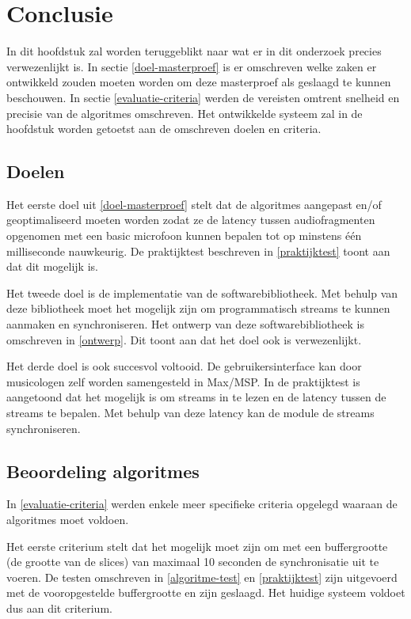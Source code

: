 \chapter{Conclusie}

In dit hoofdstuk zal worden teruggeblikt naar wat er in dit onderzoek precies verwezenlijkt is. In sectie \ref{doel-masterproef} is er omschreven welke zaken er ontwikkeld zouden moeten worden om deze masterproef als geslaagd te kunnen beschouwen. In sectie \ref{evaluatie-criteria} werden de vereisten omtrent snelheid en precisie van de algoritmes omschreven. Het ontwikkelde systeem zal in de hoofdstuk worden getoetst aan de omschreven doelen en criteria.

\section{Doelen}

Het eerste doel uit \ref{doel-masterproef} stelt dat de algoritmes aangepast en/of geoptimaliseerd moeten worden zodat ze de latency tussen audiofragmenten opgenomen met een basic microfoon kunnen bepalen tot op minstens één milliseconde nauwkeurig. De praktijktest beschreven in \ref{praktijktest} toont aan dat dit mogelijk is.

Het tweede doel is de implementatie van de softwarebibliotheek. Met behulp van deze bibliotheek moet het mogelijk zijn om programmatisch streams te kunnen aanmaken en synchroniseren. Het ontwerp van deze softwarebibliotheek is omschreven in \ref{ontwerp}. Dit toont aan dat het doel ook is verwezenlijkt.

Het derde doel is ook succesvol voltooid. De gebruikersinterface kan door musicologen zelf worden samengesteld in Max/MSP. In de praktijktest is aangetoond dat het mogelijk is om streams in te lezen en de latency tussen de streams te bepalen. Met behulp van deze latency kan de module de streams synchroniseren.

\section{Beoordeling algoritmes}

In \ref{evaluatie-criteria} werden enkele meer specifieke criteria opgelegd waaraan de algoritmes moet voldoen.

Het eerste criterium stelt dat het mogelijk moet zijn om met een buffergrootte (de grootte van de slices) van maximaal 10 seconden de synchronisatie uit te voeren. De testen omschreven in \ref{algoritme-test} en \ref{praktijktest} zijn uitgevoerd met de vooropgestelde buffergrootte en zijn geslaagd. Het huidige systeem voldoet dus aan dit criterium.

